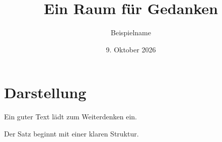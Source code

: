 \documentclass[11pt,a4paper,ngerman]{scrartcl}
\title{Ein Raum für Gedanken}
\author{Beispielname}
\date{9. Oktober 2026}
\begin{document}
\maketitle
\section*{Darstellung}
Ein guter Text lädt zum Weiterdenken ein.

Der Satz beginnt mit einer klaren Struktur.
\end{document}
